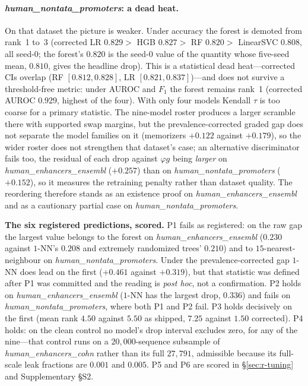 \documentclass[webpdf,modern,large,namedate]{oup-authoring-template}%
\begin{document}
\paragraph{\textit{human\_nontata\_promoters}: a dead heat.} On that dataset the picture is weaker. Under accuracy the forest is demoted from rank~1 to~3 (corrected LR $0.829>$ HGB $0.827>$ RF $0.820>$ LinearSVC $0.808$, all seed-$0$; the forest's $0.820$ is the seed-$0$ value of the quantity whose five-seed mean, $0.810$, gives the headline drop). This is a statistical dead heat---corrected CIs overlap (RF $[0.812,0.828]$, LR $[0.821,0.837]$)---and does not survive a threshold-free metric: under AUROC and $F_1$ the forest remains rank~1 (corrected AUROC $0.929$, highest of the four). With only four models Kendall $\tau$ is too coarse for a primary statistic. The nine-model roster produces a larger scramble there with supported swap margins, but the prevalence-corrected graded gap does not separate the model families on it (memorizers $+0.122$ against $+0.179$), so the wider roster does not strengthen that dataset's case; an alternative discriminator fails too, the residual of each drop against $\varphi g$ being \emph{larger} on \textit{human\_enhancers\_ensembl} ($+0.257$) than on \textit{human\_nontata\_promoters} ($+0.152$), so it measures the retraining penalty rather than dataset quality. The reordering therefore stands as an existence proof on \textit{human\_enhancers\_ensembl} and as a cautionary partial case on \textit{human\_nontata\_promoters}.

\textbf{The six registered predictions, scored.} P1 fails as registered: on the raw gap the largest value belongs to the forest on \textit{human\_enhancers\_ensembl} ($0.230$ against $1$-NN's $0.208$ and extremely randomized trees' $0.210$) and to $15$-nearest-neighbour on \textit{human\_nontata\_promoters}. Under the prevalence-corrected gap $1$-NN does lead on the first ($+0.461$ against $+0.319$), but that statistic was defined after P1 was committed and the reading is \emph{post hoc}, not a confirmation. P2 holds on \textit{human\_enhancers\_ensembl} ($1$-NN has the largest drop, $0.336$) and fails on \textit{human\_nontata\_promoters}, where both P1 and P2 fail. P3 holds decisively on the first (mean rank $4.50$ against $5.50$ as shipped, $7.25$ against $1.50$ corrected). P4 holds: on the clean control no model's drop interval excludes zero, for any of the nine---that control runs on a $20{,}000$-sequence subsample of \textit{human\_enhancers\_cohn} rather than its full $27{,}791$, admissible because its full-scale leak fractions are $0.001$ and $0.005$. P5 and P6 are scored in \S\ref{sec:r-tuning} and Supplementary \S S2.
\end{document}
